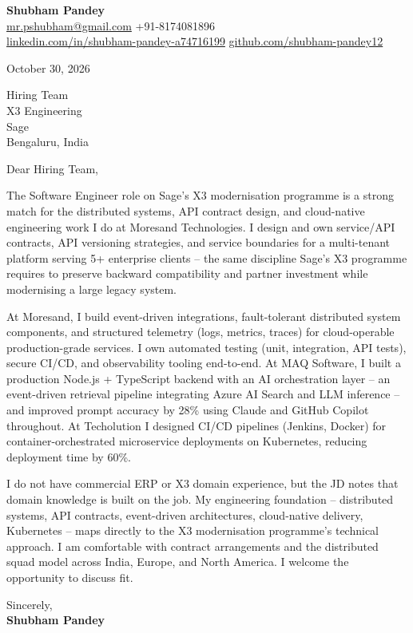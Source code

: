 \documentclass[a4paper,11pt]{article}
\begin{document}
\textbf{\Large Shubham Pandey}\\
\href{mailto:mr.pshubham@gmail.com}{mr.pshubham@gmail.com} \quad +91-8174081896\\
\href{https://www.linkedin.com/in/shubham-pandey-a74716199/}{linkedin.com/in/shubham-pandey-a74716199} \quad
\href{https://github.com/shubham-pandey12}{github.com/shubham-pandey12}

\vspace{1em}
October 30, 2026

\vspace{1em}
Hiring Team\\
X3 Engineering\\
Sage\\
Bengaluru, India

\vspace{1em}
Dear Hiring Team,

The Software Engineer role on Sage's X3 modernisation programme is a strong match for the distributed systems, API contract design, and cloud-native engineering work I do at Moresand Technologies. I design and own service/API contracts, API versioning strategies, and service boundaries for a multi-tenant platform serving 5+ enterprise clients -- the same discipline Sage's X3 programme requires to preserve backward compatibility and partner investment while modernising a large legacy system.

At Moresand, I build event-driven integrations, fault-tolerant distributed system components, and structured telemetry (logs, metrics, traces) for cloud-operable production-grade services. I own automated testing (unit, integration, API tests), secure CI/CD, and observability tooling end-to-end. At MAQ Software, I built a production Node.js + TypeScript backend with an AI orchestration layer -- an event-driven retrieval pipeline integrating Azure AI Search and LLM inference -- and improved prompt accuracy by 28\% using Claude and GitHub Copilot throughout. At Techolution I designed CI/CD pipelines (Jenkins, Docker) for container-orchestrated microservice deployments on Kubernetes, reducing deployment time by 60\%.

I do not have commercial ERP or X3 domain experience, but the JD notes that domain knowledge is built on the job. My engineering foundation -- distributed systems, API contracts, event-driven architectures, cloud-native delivery, Kubernetes -- maps directly to the X3 modernisation programme's technical approach. I am comfortable with contract arrangements and the distributed squad model across India, Europe, and North America. I welcome the opportunity to discuss fit.

\vspace{1em}
Sincerely,\\[0.5em]
\textbf{Shubham Pandey}
\end{document}
